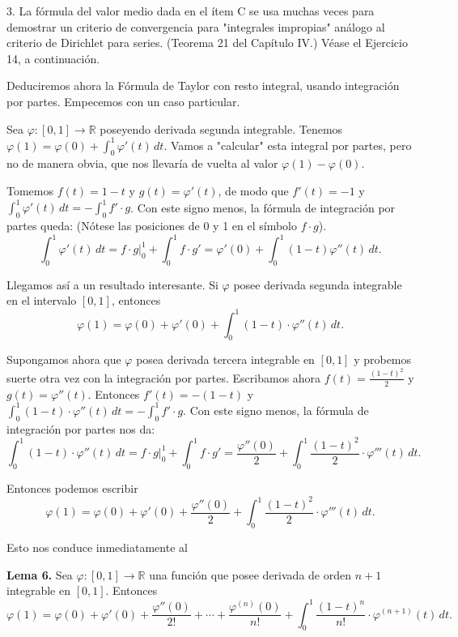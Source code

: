 \documentclass[12pt,oneside]{book}
\begin{document}
3. La fórmula del valor medio dada en el ítem C se usa muchas veces para demostrar un criterio de convergencia para "integrales impropias" análogo al criterio de Dirichlet para series. (Teorema 21 del Capítulo IV.) Véase el Ejercicio 14, a continuación.

Deduciremos ahora la Fórmula de Taylor con resto integral, usando integración por partes. Empecemos con un caso particular.

Sea \(\varphi: [0, 1] \to \mathbb{R}\) poseyendo derivada segunda integrable. Tenemos \(\varphi(1) = \varphi(0) + \int_0^1 \varphi'(t) \, dt\). Vamos a "calcular" esta integral por partes, pero no de manera obvia, que nos llevaría de vuelta al valor \(\varphi(1) - \varphi(0)\).

Tomemos \(f(t) = 1 - t\) y \(g(t) = \varphi'(t)\), de modo que \(f'(t) = -1\) y \(\int_0^1 \varphi'(t) \, dt = -\int_0^1 f' \cdot g\). Con este signo menos, la fórmula de integración por partes queda: (Nótese las posiciones de 0 y 1 en el símbolo \(f \cdot g\)).
\[
\int_0^1 \varphi'(t) \, dt = f \cdot g \bigg|_0^1 + \int_0^1 f \cdot g' = \varphi'(0) + \int_0^1 (1 - t) \varphi''(t) \, dt.
\]

Llegamos así a un resultado interesante. Si \(\varphi\) posee derivada segunda integrable en el intervalo \([0, 1]\), entonces
\[
\varphi(1) = \varphi(0) + \varphi'(0) + \int_0^1 (1 - t) \cdot \varphi''(t) \, dt.
\]

Supongamos ahora que \(\varphi\) posea derivada tercera integrable en \([0,1]\) y probemos suerte otra vez con la integración por partes. Escribamos ahora \(f(t) = \frac{(1 - t)^2}{2}\) y \(g(t) = \varphi''(t)\). Entonces \(f'(t) = -(1 - t)\) y \(\int_0^1 (1 - t) \cdot \varphi''(t) \, dt = -\int_0^1 f' \cdot g\). Con este signo menos, la fórmula de integración por partes nos da:
\[
\int_0^1 (1 - t) \cdot \varphi''(t) \, dt = f \cdot g \Big|_0^1 + \int_0^1 f \cdot g' = \frac{\varphi''(0)}{2} + \int_0^1 \frac{(1 - t)^2}{2} \cdot \varphi'''(t) \, dt.
\]

Entonces podemos escribir
\[
\varphi(1) = \varphi(0) + \varphi'(0) + \frac{\varphi''(0)}{2} + \int_0^1 \frac{(1 - t)^2}{2} \cdot \varphi'''(t) \, dt.
\]

Esto nos conduce inmediatamente al

\textbf{Lema 6.} Sea \(\varphi: [0,1] \to \mathbb{R}\) una función que posee derivada de orden \(n+1\) integrable en \([0,1]\). Entonces
\[
\varphi(1) = \varphi(0) + \varphi'(0) + \frac{\varphi''(0)}{2!} + \cdots + \frac{\varphi^{(n)}(0)}{n!}
+ \int_0^1 \frac{(1 - t)^n}{n!} \cdot \varphi^{(n+1)}(t) \, dt.
\]
\end{document}
